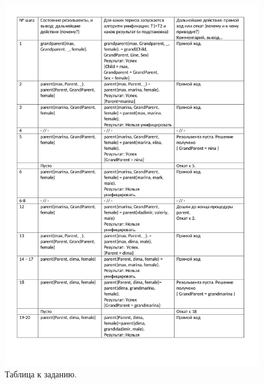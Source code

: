 \begin{figure}[H]
	\caption{Таблица к заданию.}
	\begin{center}
		\includegraphics[scale=0.85]{img/14.1.pdf}
	\end{center}
	
\end{figure}

